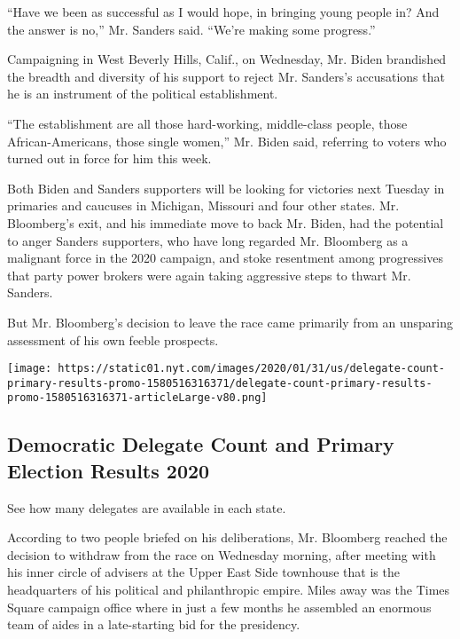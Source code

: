 ``Have we been as successful as I would hope, in bringing young people
in? And the answer is no,'' Mr. Sanders said. ``We're making some
progress.''

Campaigning in West Beverly Hills, Calif., on Wednesday, Mr. Biden
brandished the breadth and diversity of his support to reject Mr.
Sanders's accusations that he is an instrument of the political
establishment.

``The establishment are all those hard-working, middle-class people,
those African-Americans, those single women,'' Mr. Biden said, referring
to voters who turned out in force for him this week.

Both Biden and Sanders supporters will be looking for victories next
Tuesday in primaries and caucuses in Michigan, Missouri and four other
states. Mr. Bloomberg's exit, and his immediate move to back Mr. Biden,
had the potential to anger Sanders supporters, who have long regarded
Mr. Bloomberg as a malignant force in the 2020 campaign, and stoke
resentment among progressives that party power brokers were again taking
aggressive steps to thwart Mr. Sanders.

But Mr. Bloomberg's decision to leave the race came primarily from an
unsparing assessment of his own feeble prospects.

\href{https://www.nytimes.com/interactive/2020/us/elections/delegate-count-primary-results.html}{}

\texttt{[image: https://static01.nyt.com/images/2020/01/31/us/delegate-count-primary-results-promo-1580516316371/delegate-count-primary-results-promo-1580516316371-articleLarge-v80.png]}

\hypertarget{democratic-delegate-count-and-primary-election-results-2020}{%
\subsection{Democratic Delegate Count and Primary Election Results
2020}\label{democratic-delegate-count-and-primary-election-results-2020}}

See how many delegates are available in each state.

According to two people briefed on his deliberations, Mr. Bloomberg
reached the decision to withdraw from the race on Wednesday morning,
after meeting with his inner circle of advisers at the Upper East Side
townhouse that is the headquarters of his political and philanthropic
empire. Miles away was the Times Square campaign office where in just a
few months he assembled an enormous team of aides in a late-starting bid
for the presidency.


